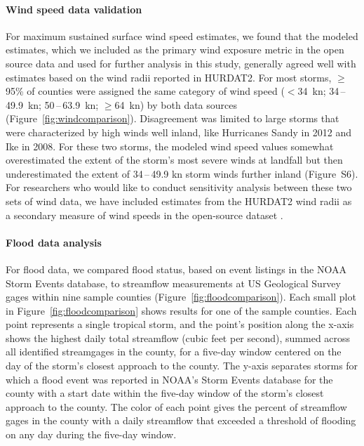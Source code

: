 \paragraph{Wind speed data validation}

For maximum sustained surface wind speed estimates, we found that the modeled
estimates, which we included as the primary wind exposure metric in the open
source data and used for further analysis in this study, generally agreed well
with estimates based on the wind radii reported in \ac{HURDAT2}. For most
storms, $\ge$95\% of counties were assigned the same category of wind speed
($<$34~\si{\knot}; 34\,--\,49.9~\si{\knot}; 50\,--\,63.9~\si{\knot};
$\ge$64~\si{\knot}) by both data sources (Figure~\ref{fig:windcomparison}).
Disagreement was limited to large storms that were characterized by high winds
well inland, like Hurricanes Sandy in 2012 and Ike in 2008. For these two
storms, the modeled wind speed values somewhat overestimated the extent of the
storm's most severe winds at landfall but then underestimated the extent of
34\,--\,49.9 \si{\knot} storm winds further inland (Figure~S6). For researchers
who would like to conduct sensitivity analysis between these two sets of wind
data, we have included estimates from the \ac{HURDAT2} wind radii as a
secondary measure of wind speeds in the open-source dataset
\parencite{hurricaneexposuredata}.

\paragraph{Flood data analysis}

For flood data, we compared flood status, based on event listings in the NOAA
Storm Events database, to streamflow measurements at \ac{US} Geological Survey
gages within nine sample counties (Figure~\ref{fig:floodcomparison}). Each
small plot in Figure~\ref{fig:floodcomparison} shows results for one of the
sample counties.  Each point represents a single tropical storm, and the
point's position along the x-axis shows the highest daily total streamflow
(cubic feet per second), summed across all identified streamgages in the
county, for a five-day window centered on the day of the storm's closest
approach to the county. The y-axis separates storms for which a flood event was
reported in NOAA's Storm Events database for the county with a start date
within the five-day window of the storm's closest approach to the county. The
color of each point gives the percent of streamflow gages in the county with a
daily streamflow that exceeded a threshold of flooding on any day during the
five-day window.  

